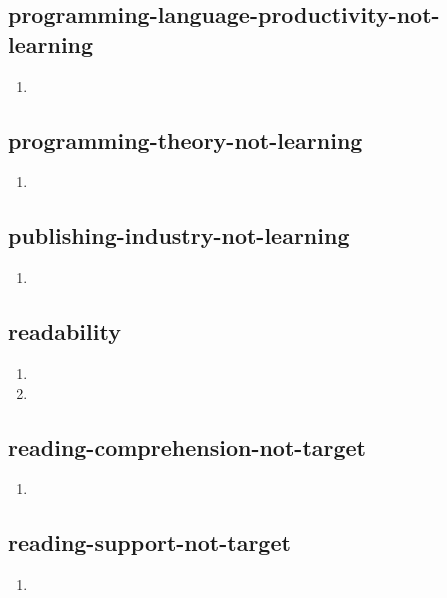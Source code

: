 \documentclass{article}
\begin{document}
\subsection{programming-language-productivity-not-learning}
\begin{enumerate}
\item {}
\end{enumerate}

\subsection{programming-theory-not-learning}
\begin{enumerate}
\item {}
\end{enumerate}

\subsection{publishing-industry-not-learning}
\begin{enumerate}
\item {}
\end{enumerate}

\subsection{readability}
\begin{enumerate}
\item {}
\item {}
\end{enumerate}

\subsection{reading-comprehension-not-target}
\begin{enumerate}
\item {}
\end{enumerate}

\subsection{reading-support-not-target}
\begin{enumerate}
\item {}
\end{enumerate}
\end{document}
